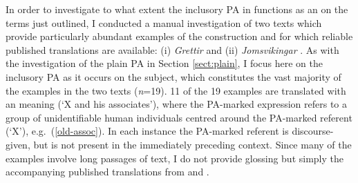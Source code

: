\documentclass[output=paper,colorlinks,citecolor=brown]{langscibook}
\begin{document}
\newpage
In order to investigate to what extent the inclusory PA in  functions as an  on the terms just outlined, I conducted a manual investigation of two texts which provide particularly abundant examples of the construction and for which reliable published  translations are available: (i) \textit{Grettir} \citep{faulkes2001three} and (ii) \textit{Jomsvikingar} \citep{finlay2018jomsviking}.  As with the investigation of the plain PA in Section \ref{sect:plain}, I focus here on the inclusory PA as it occurs on the subject, which constitutes the vast majority of the examples in the two texts (\textit{n}=19). 11 of the 19 examples are translated with an  meaning (`X and his associates'), where the PA-marked expression refers to a group of unidentifiable human individuals centred around the PA-marked referent (`X'), e.g.~(\ref{old-assoc}). 
In each instance the PA-marked referent is discourse-given, but is not present in the immediately preceding context. %
Since many of the examples involve long passages of text, I do not provide glossing but simply the accompanying published translations from  \citet{faulkes2001three} and \citet{finlay2018jomsviking}.
\end{document}
